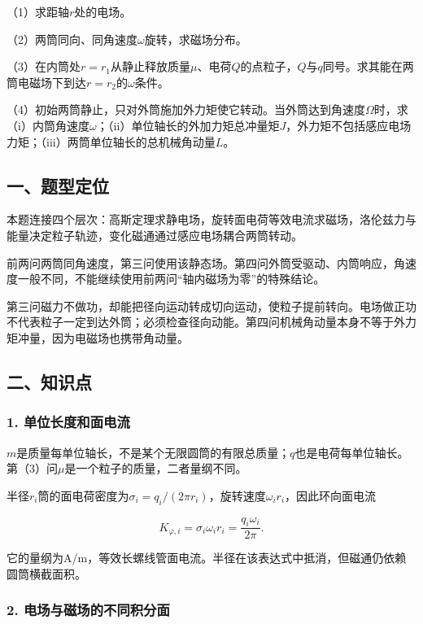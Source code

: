 \documentclass[12pt,a4paper,fontset=fandol]{ctexart}
\begin{document}
（1）求距轴\(r\)处的电场。

（2）两筒同向、同角速度\(\omega\)旋转，求磁场分布。

（3）在内筒处\(r=r_1\)从静止释放质量\(\mu\)、电荷\(Q\)的点粒子，\(Q\)与\(q\)同号。求其能在两筒电磁场下到达\(r=r_2\)的\(\omega\)条件。

（4）初始两筒静止，只对外筒施加外力矩使它转动。当外筒达到角速度\(\Omega\)时，求（i）内筒角速度\(\omega\)；（ii）单位轴长的外加力矩总冲量矩\(J\)，外力矩不包括感应电场力矩；（iii）两筒单位轴长的总机械角动量\(L\)。

\subsection{一、题型定位}\label{ux4e00ux9898ux578bux5b9aux4f4d-5}

本题连接四个层次：高斯定理求静电场，旋转面电荷等效电流求磁场，洛伦兹力与能量决定粒子轨迹，变化磁通通过感应电场耦合两筒转动。

前两问两筒同角速度，第三问使用该静态场。第四问外筒受驱动、内筒响应，角速度一般不同，不能继续使用前两问``轴内磁场为零''的特殊结论。

第三问磁力不做功，却能把径向运动转成切向运动，使粒子提前转向。电场做正功不代表粒子一定到达外筒；必须检查径向动能。第四问机械角动量本身不等于外力矩冲量，因为电磁场也携带角动量。

\subsection{二、知识点}\label{ux4e8cux77e5ux8bc6ux70b9-5}

\subsubsection{1.
单位长度和面电流}\label{ux5355ux4f4dux957fux5ea6ux548cux9762ux7535ux6d41}

\(m\)是质量每单位轴长，不是某个无限圆筒的有限总质量；\(q\)也是电荷每单位轴长。第（3）问\(\mu\)是一个粒子的质量，二者量纲不同。

半径\(r_i\)筒的面电荷密度为\(\sigma_i=q_i/(2\pi r_i)\)，旋转速度\(\omega_i r_i\)，因此环向面电流

\[
K_{\varphi,i}=\sigma_i\omega_i r_i
=\frac{q_i\omega_i}{2\pi}.
\]

它的量纲为A/m，等效长螺线管面电流。半径在该表达式中抵消，但磁通仍依赖圆筒横截面积。

\subsubsection{2.
电场与磁场的不同积分面}\label{ux7535ux573aux4e0eux78c1ux573aux7684ux4e0dux540cux79efux5206ux9762}
\end{document}
